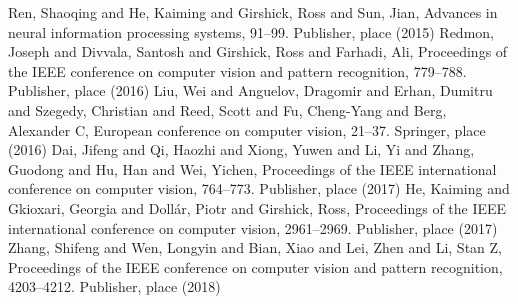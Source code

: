 \begin{thebibliography}{}
Ren, Shaoqing and He, Kaiming and Girshick, Ross and Sun, Jian, Advances in neural information processing systems, 91--99. Publisher, place (2015)
Redmon, Joseph and Divvala, Santosh and Girshick, Ross and Farhadi, Ali, Proceedings of the IEEE conference on computer vision and pattern recognition, 779--788. Publisher, place (2016)
Liu, Wei and Anguelov, Dragomir and Erhan, Dumitru and Szegedy, Christian and Reed, Scott and Fu, Cheng-Yang and Berg, Alexander C, European conference on computer vision, 21--37. Springer, place (2016)
Dai, Jifeng and Qi, Haozhi and Xiong, Yuwen and Li, Yi and Zhang, Guodong and Hu, Han and Wei, Yichen, Proceedings of the IEEE international conference on computer vision, 764--773. Publisher, place (2017)
He, Kaiming and Gkioxari, Georgia and Doll{\'a}r, Piotr and Girshick, Ross, Proceedings of the IEEE international conference on computer vision, 2961--2969. Publisher, place (2017)
Zhang, Shifeng and Wen, Longyin and Bian, Xiao and Lei, Zhen and Li, Stan Z, Proceedings of the IEEE conference on computer vision and pattern recognition, 4203--4212. Publisher, place (2018)
\end{thebibliography}



